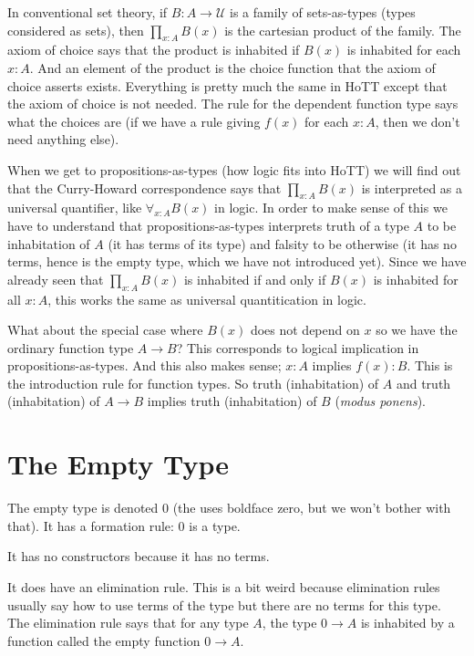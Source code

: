 \documentclass[11pt]{article}
\newcommand{\universe}{\mathcal{U}}
\begin{document}
In conventional set theory, if $B : A \to \universe$ is a family
of sets-as-types (types considered as sets),
then $\prod_{x : A} B(x)$ is the cartesian product of the
family.  The axiom of choice says that the product is inhabited if $B(x)$
is inhabited for each $x : A$.  And an element of the product is the choice
function that the axiom of choice asserts exists.
Everything is pretty much the same in HoTT except that the axiom of choice
is not needed.  The rule for the dependent function type says what the choices
are (if we have a rule giving $f(x)$ for each $x : A$, then we don't need
anything else).

When we get to propositions-as-types (how logic fits into HoTT) we will
find out that the Curry-Howard correspondence says that $\prod_{x: A} B(x)$
is interpreted as a universal quantifier, like $\forall_{x : A} B(x)$ in
logic.  In order to make sense of this we have to understand that
propositions-as-types interprets truth of a type $A$ to be inhabitation
of $A$ (it has terms of its type) and falsity to be otherwise (it has no
terms, hence is the empty type, which we have not introduced yet).
Since we have already seen that $\prod_{x : A} B(x)$ is inhabited if and only
if $B(x)$ is inhabited for all $x : A$, this works the same as universal
quantitication in logic.

What about the special case where $B(x)$ does not depend on $x$ so we have
the ordinary function type $A \to B$?  This corresponds to logical implication
in propositions-as-types.  And this also makes sense; $x : A$ implies
$f(x) : B$.  This is the introduction rule for function types.  So truth
(inhabitation) of $A$ and truth (inhabitation) of $A \to B$ implies
truth (inhabitation) of $B$ (\emph{modus ponens}).

\section{The Empty Type}

The empty type is denoted $0$ (the  uses boldface
zero, but we won't bother with that).  It has a formation rule: 0 is a type.

It has no constructors because it has no terms.

It does have an elimination rule.  This is a bit weird because elimination
rules usually say how to use terms of the type but there are no terms
for this type.  The elimination rule says that for any type $A$, the
type $0 \to A$ is inhabited by a function called the empty function $0 \to A$.
\end{document}

